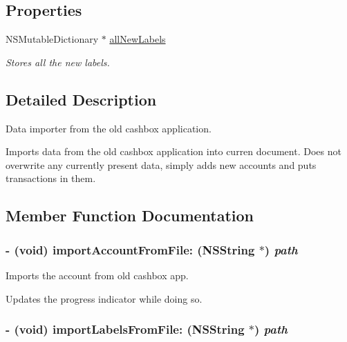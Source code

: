 \subsection*{Properties}
\begin{CompactItemize}
\item 
\hypertarget{interface_z_x_old_cashbox_importer_3cc86bf53e79f80e25e60a955458927e}{
NSMutableDictionary $\ast$ \hyperlink{interface_z_x_old_cashbox_importer_3cc86bf53e79f80e25e60a955458927e}{allNewLabels}}
\label{interface_z_x_old_cashbox_importer_3cc86bf53e79f80e25e60a955458927e}

\begin{CompactList}\small\item\em Stores all the new labels. \item\end{CompactList}\end{CompactItemize}


\subsection{Detailed Description}
Data importer from the old cashbox application. 

Imports data from the old cashbox application into curren document. Does not overwrite any currently present data, simply adds new accounts and puts transactions in them. 

\subsection{Member Function Documentation}
\hypertarget{interface_z_x_old_cashbox_importer_58a7e29a3daf68ba41686fef6f46bdc4}{
\subsubsection[{importAccountFromFile:}]{\setlength{\rightskip}{0pt plus 5cm}- (void) importAccountFromFile: (NSString $\ast$) {\em path}}}
\label{interface_z_x_old_cashbox_importer_58a7e29a3daf68ba41686fef6f46bdc4}


Imports the account from old cashbox app. 

Updates the progress indicator while doing so. \hypertarget{interface_z_x_old_cashbox_importer_a0ff323ece14ee720fa1f60148ce419f}{
\subsubsection[{importLabelsFromFile:}]{\setlength{\rightskip}{0pt plus 5cm}- (void) importLabelsFromFile: (NSString $\ast$) {\em path}}}
\label{interface_z_x_old_cashbox_importer_a0ff323ece14ee720fa1f60148ce419f}


